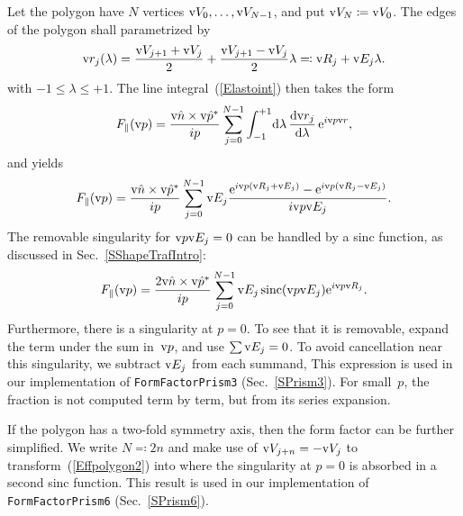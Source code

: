 Let the polygon have $N$ vertices $\text{v}{V}_0,\ldots,\text{v}{V}_{N-1}$,
and put $\text{v}{V}_N\coloneqq\text{v}{V}_0$.
The edges of the polygon shall parametrized by
\begin{equation}
  \text{v}{r}_j(\lambda) = \frac{\text{v}{V}_{j+1}+\text{v}{V}_j}{2} + \frac{\text{v}{V}_{j+1}-\text{v}{V}_j}{2} \lambda
  \eqqcolon \text{v}{R}_j + \text{v}{E}_j\lambda.
\end{equation}
with $-1\le\lambda\le+1$.
The line integral~(\ref{Elastoint}) then takes the form
\begin{equation}
    F_\parallel(\text{v}{p})
   = \frac{\text{v}{\hat n}\times\text{v}{\hat p}^*}{ip} \sum_{j=0}^{N-1}
              \int_{-1}^{+1}\!\text{d}\lambda\, \frac{\text{d}\text{v}{r}_j}{\text{d}\lambda}\,\text{e}^{i\text{v}{p}\text{v}{r}},
\end{equation}
and yields
\begin{equation}\label{Effpolygon1}
    F_\parallel(\text{v}{p})
    = \frac{\text{v}{\hat n}\times\text{v}{\hat p}^*}{ip}
      \sum_{j=0}^{N-1} \text{v}{E}_j \frac{\text{e}^{i\text{v}{p}(\text{v}{R}_j+\text{v}{E}_j)}-\text{e}^{i\text{v}{p}(\text{v}{R}_j-\text{v}{E}_j)}}{i\text{v}{p}\text{v}{E}_j}.
\end{equation}
The removable singularity for $\text{v}{p}\text{v}{E}_j=0$
can be handled by a sinc function, as discussed in Sec.~\ref{SShapeTrafIntro}:
\begin{equation}\label{Effpolygon2}
    F_\parallel(\text{v}{p})
    = \frac{2\text{v}{\hat n}\times\text{v}{\hat p}^*}{ip}
      \sum_{j=0}^{N-1} \text{v}{E}_j \operatorname{sinc}(\text{v}{p}\text{v}{E}_j) \text{e}^{i\text{v}{p}\text{v}{R}_j}.
\end{equation}
Furthermore, there is a singularity at $p=0$.
To see that it is removable,
expand the term under the sum in~$\text{v}{p}$,
and use $\sum\text{v}{E}_j=0$.
To avoid cancellation near this singularity, we subtract $\text{v}{E}_j$ from each summand,
This expression is used in our implementation of \texttt{FormFactorPrism3}
(Sec.~\ref{SPrism3}).
For small~$p$, the fraction is not computed term by term,
but from its series expansion.

If the polygon has a two-fold symmetry axis,
then the form factor can be further simplified.
We write $N\eqqcolon2n$
and make use of $\text{v}{V}_{j+n}=-\text{v}{V}_j$ to transform~(\ref{Effpolygon2}) into
where the singularity at $p=0$ is absorbed in a second sinc function.
This result is used in our implementation of \texttt{FormFactorPrism6}
(Sec.~\ref{SPrism6}).
%

